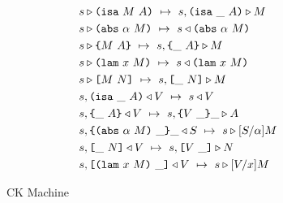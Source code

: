 \documentclass[../main.tex]{subfiles}
\begin{document}
\begin{figure*}[t]
    
    \begin{align*}
        &s \triangleright \texttt{(} \texttt{isa} ~ M ~ A \texttt{)} ~\mapsto~ s, \texttt{(} \texttt{isa} ~ \_ ~ A \texttt{)} \triangleright M\\
        &s \triangleright \texttt{(} \texttt{abs} ~ \alpha ~ M \texttt{)} ~\mapsto~ s \triangleleft \texttt{(} \texttt{abs} ~ \alpha ~ M \texttt{)}\\
        &s \triangleright \texttt{\{}M ~ A\texttt{\}} ~\mapsto~ s, \texttt{\{}\_ ~ A\texttt{\}} \triangleright M\\
        &s \triangleright \texttt{(} \texttt{lam} ~ x ~ M \texttt{)} ~\mapsto~ s \triangleleft \texttt{(} \texttt{lam} ~ x ~ M \texttt{)}\\
        &s \triangleright \texttt{[} M ~ N \texttt{]} ~\mapsto~ s, \texttt{[} \_ ~ N \texttt{]} \triangleright M\\
        &s, \texttt{(} \texttt{isa} ~ \_ ~ A \texttt{)} \triangleleft V ~\mapsto~ s \triangleleft V\\
        &s, \texttt{\{}\_ ~ A\texttt{\}} \triangleleft V ~\mapsto~ s, \texttt{\{}V ~ \_\texttt{\}}{\_} \triangleright A\\
        &s, \texttt{\{}\texttt{(} \texttt{abs} ~ \alpha ~ M \texttt{)} ~ \_\texttt{\}}{\_} \triangleleft S ~\mapsto~ s \triangleright [S/\alpha]M\\
        &s, \texttt{[} \_ ~ N \texttt{]} \triangleleft V ~\mapsto~ s, \texttt{[} V ~ \_ \texttt{]} \triangleright N\\
        &s, \texttt{[} \texttt{(} \texttt{lam} ~ x ~ M \texttt{)} ~ \_ \texttt{]} \triangleleft V ~\mapsto~ s \triangleright [V/x]M\\
    \end{align*}
    
    \caption{CK Machine}
    \label{fig:Plutus_core_ck_machine}
\end{figure*}
\end{document}
